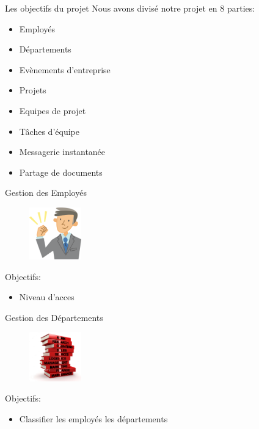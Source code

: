 \begin{frame}{Les objectifs du projet}
 Nous avons divisé notre projet en 8 parties:
  \begin{itemize}
  \item Employés
\item Départements
 \item Evènements d'entreprise
 \item Projets
 \item Equipes de projet
 \item Tâches d'équipe
  \item Messagerie instantanée
\item Partage de documents
    \end{itemize}
\end{frame}

\begin{frame}{Gestion des Employés}
\begin{figure}[h!]
  \includegraphics[width=0.2\textwidth]{images/employee}
\end{figure}
Objectifs:
  \begin{itemize}
    \item Niveau d'acces
  \end{itemize}
\end{frame}

\begin{frame}{Gestion des Départements}
\begin{figure}[h!]
  \includegraphics[width=0.2\textwidth]{images/department}
\end{figure}
Objectifs:
  \begin{itemize}
    \item Classifier les employés
    \Classifier les départements
  \end{itemize}
\end{frame}

